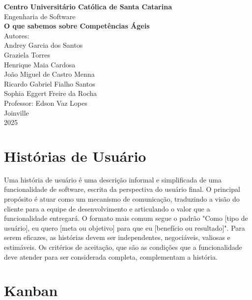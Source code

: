 \documentclass[12pt,a4paper]{article}
\begin{document}
\begin{center}
    \centering

    {\Large \textbf{Centro Universitário Católica de Santa Catarina}}\\[0.5cm]
    {\large Engenharia de Software}\\[4cm]

    {\Huge \textbf{O que sabemos sobre Competências Ágeis}}\\[0.5cm]

    {\large Autores:}\\[0.5cm]
    {\large Andrey Garcia dos Santos}\\[0.5cm]
    {\large Graziela Torres}\\[0.5cm]
    {\large Henrique Maia Cardosa}\\[0.5cm]
    {\large João Miguel de Castro Menna}\\[0.5cm]
    {\large Ricardo Gabriel Fialho Santos}\\[0.5cm]
    {\large Sophia Eggert Freire da Rocha}\\[2.5cm]

    {\large Professor: Edson Vaz Lopes}\\[0.5cm]

    \vfill
    {\large Joinville}\\
    {\large 2025}
\end{center}

\section{Histórias de Usuário}

Uma história de usuário é uma descrição informal e simplificada de uma funcionalidade de software, escrita da perspectiva
do usuário final. O principal propósito é atuar como um mecanismo de comunicação, traduzindo a visão do cliente para a equipe
de desenvolvimento e articulando o valor que a funcionalidade entregará. O formato mais comum segue o padrão "Como [tipo de usuário],
eu quero [meta ou objetivo] para que eu [benefício ou resultado]". Para serem eficazes, as histórias devem ser independentes,
negociáveis, valiosas e estimáveis. Os critérios de aceitação, que são as condições que a funcionalidade deve atender para ser
considerada completa, complementam a história.



\section{Kanban}
\end{document}
